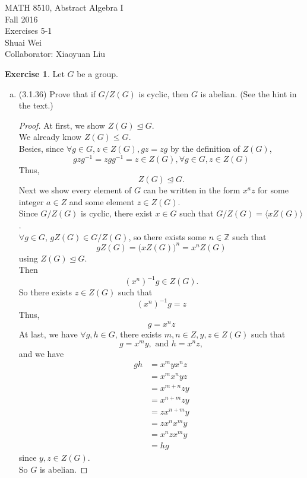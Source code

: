 \documentclass[14pt]{amsart}
\newcommand{\bbz}{\mathbb{Z}}
\theoremstyle{plain}
\theoremstyle{definition}
\newtheorem{exer}[lem]{Exercise}
\begin{document}
\noindent MATH 8510, Abstract Algebra I \\
Fall 2016\\
Exercises 5-1\\
Shuai Wei\\
Collaborator: Xiaoyuan Liu
\

%
%

\begin{exer}
Let $G$ be a group.
\begin{enumerate}[(a)]
\item (3.1.36) Prove that if $G/Z(G)$ is cyclic, then $G$ is abelian. (See the hint in the text.)
  \begin{proof}	
	At first, we show $Z(G) \unlhd G$.\\
	We already know $Z(G) \leq G$.\\
	Besies, since $\forall g \in G, z \in Z(G) , gz = zg$ by the definition of $Z(G)$,
   	\[ gzg^{-1} = zgg^{-1} = z \in Z(G), \forall g\in G, z\in Z(G) \] 
	Thus,
	\[Z(G) \unlhd G.\]
	Next we show every element of $G$ can be written in the form $x^az$ for some integer $a\in Z$ and some element $z \in Z(G)$.\\
	Since $G/Z(G)$ is cyclic, there exist $x \in G$ such that $G/Z(G) =\langle xZ(G) \rangle$.\\
	$\forall g \in G$, $gZ(G) \in G/Z(G)$, so there exists some $n \in \bbz$ such that
  	\[gZ(G) = \big(xZ(G)\big)^n = x^nZ(G) \]
	using $Z(G) \unlhd G $.\\
	Then 
	\[(x^n)^{-1}g \in Z(G).\]
	So there exists $z \in Z(G)$ such that
	\[(x^n)^{-1}g = z\]
	Thus,
	\[ g = x^nz\]
	At last, we have $\forall g,h \in G$, there exists $ m,n \in Z, y,z\in Z(G)$ such that
  	\[g= x^my, \text { and } h = x^nz,\]
	 and we have 
	 \begin{align*}
  		 gh &= x^myx^nz \\
		 	&=x^mx^nyz\\
			&=x^{m+n}zy\\
			&=x^{n+m}zy\\
			&=zx^{n+m}y\\
			&=zx^nx^my\\
			&=x^nzx^my\\
			&=hg
  	 \end{align*}
	since $y, z \in Z(G)$.\\
	So $G$ is abelian.
	
  \end{proof}  	  


\end{enumerate}
\end{exer}
\end{document}
